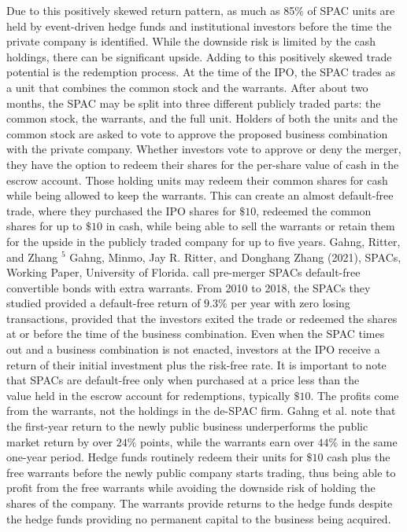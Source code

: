 \documentclass[11pt]{article}
\begin{document}
Due to this positively skewed return pattern, as much as 85\% of SPAC units are held by event-driven hedge funds and institutional investors before the time the private company is identified. While the downside risk is limited by the cash holdings, there can be significant upside. Adding to this positively skewed trade potential is the redemption process. At the time of the IPO, the SPAC trades as a unit that combines the common stock and the warrants. After about two months, the SPAC may be split into three different publicly traded parts: the common stock, the warrants, and the full unit. Holders of both the units and the common stock are asked to vote to approve the proposed business combination with the private company. Whether investors vote to approve or deny the merger, they have the option to redeem their shares for the per-share value of cash in the escrow account. Those holding units may redeem their common shares for cash while being allowed to keep the warrants. This can create an almost default-free trade, where they purchased the IPO shares for $\$ 10$, redeemed the common shares for up to $\$ 10$ in cash, while being able to sell the warrants or retain them for the upside in the publicly traded company for up to five years. Gahng, Ritter, and Zhang ${ }^{5}$ Gahng, Minmo, Jay R. Ritter, and Donghang Zhang (2021), SPACs, Working Paper, University of Florida. call pre-merger SPACs default-free convertible bonds with extra warrants. From 2010 to 2018, the SPACs they studied provided a default-free return of $9.3 \%$ per year with zero losing transactions, provided that the investors exited the trade or redeemed the shares at or before the time of the business combination. Even when the SPAC times out and a business combination is not enacted, investors at the IPO receive a return of their initial investment plus the risk-free rate. It is important to note that SPACs are default-free only when purchased at a price less than the\\
value held in the escrow account for redemptions, typically $\$ 10$. The profits come from the warrants, not the holdings in the de-SPAC firm. Gahng et al. note that the first-year return to the newly public business underperforms the public market return by over $24 \%$ points, while the warrants earn over $44 \%$ in the same one-year period. Hedge funds routinely redeem their units for $\$ 10$ cash plus the free warrants before the newly public company starts trading, thus being able to profit from the free warrants while avoiding the downside risk of holding the shares of the company. The warrants provide returns to the hedge funds despite the hedge funds providing no permanent capital to the business being acquired.
\end{document}
